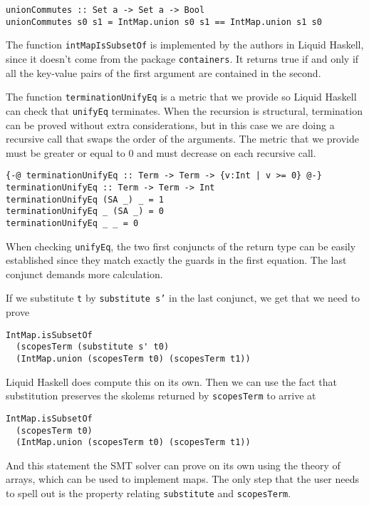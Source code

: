 \documentclass[acmtog, anonymous]{acmart}
\newcommand{\tc}[1]{{\small\texttt{#1}}}
\begin{document}
\begin{verbatim}
unionCommutes :: Set a -> Set a -> Bool
unionCommutes s0 s1 = IntMap.union s0 s1 == IntMap.union s1 s0
\end{verbatim}

The function \tc{intMapIsSubsetOf} is implemented by the authors in Liquid
Haskell, since it doesn't come from the package \tc{containers}. It returns
true if and only if all the key-value pairs of the first argument are contained
in the second.

The function \tc{terminationUnifyEq} is a metric that we provide so Liquid
Haskell can check that \tc{unifyEq} terminates. When the recursion is
structural, termination can be proved without extra considerations, but in
this case we are doing a recursive call that swaps the order of the arguments.
The metric that we provide must be greater or equal to 0 and must decrease on
each recursive call.

\begin{verbatim}
{-@ terminationUnifyEq :: Term -> Term -> {v:Int | v >= 0} @-}
terminationUnifyEq :: Term -> Term -> Int
terminationUnifyEq (SA _) _ = 1
terminationUnifyEq _ (SA _) = 0
terminationUnifyEq _ _ = 0
\end{verbatim}

When checking \tc{unifyEq}, the two first conjuncts of the return type can
be easily established since they match exactly the guards in the first equation.
The last conjunct demands more calculation.

If we substitute \tc{t} by \tc{substitute s'} in the last conjunct, we get that we
need to prove

\begin{verbatim}
IntMap.isSubsetOf
  (scopesTerm (substitute s' t0)
  (IntMap.union (scopesTerm t0) (scopesTerm t1))
\end{verbatim}

Liquid Haskell does compute this on its own. Then we can use the fact that substitution
preserves the skolems returned by \tc{scopesTerm} to arrive at

\begin{verbatim}
IntMap.isSubsetOf
  (scopesTerm t0)
  (IntMap.union (scopesTerm t0) (scopesTerm t1))
\end{verbatim}

And this statement the SMT solver can prove on its own using the theory of arrays,
which can be used to implement maps. The only step that the user needs to spell out
is the property relating \tc{substitute} and \tc{scopesTerm}.
\end{document}
